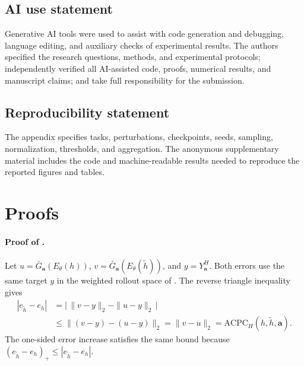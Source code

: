 \documentclass{article}
\begin{document}
\clearpage
\subsection*{AI use statement}
Generative AI tools were used to assist with code generation and debugging,
language editing, and auxiliary checks of experimental results. The authors
specified the research questions, methods, and experimental protocols;
independently verified all AI-assisted code, proofs, numerical results, and
manuscript claims; and take full responsibility for the submission.

\subsection*{Reproducibility statement}
The appendix specifies tasks, perturbations, checkpoints, seeds, sampling,
normalization, thresholds, and aggregation. The anonymous supplementary
material includes the code and machine-readable results needed to reproduce
the reported figures and tables.




\FloatBarrier
\appendix
\section{Proofs}\label{sec:appendix-acpc-proofs}

\paragraph{Proof of .}
Let $u=\bar G_{\mathbf a}(E_\theta(h))$,
$v=\bar G_{\mathbf a}(E_\theta(\tilde h))$, and $y=Y_{\mathbf a}^H$. Both
errors use the same target $y$ in the weighted rollout space of
. The reverse triangle inequality gives
\begin{align}
|e_{\tilde h}-e_h|
&=\bigl|\,\|v-y\|_2-\|u-y\|_2\,\bigr| \\
&\le \|(v-y)-(u-y)\|_2
=\|v-u\|_2
=\mathrm{ACPC}_H(h,\tilde h,\mathbf a).
\end{align}
The one-sided error increase satisfies the same bound because
$(e_{\tilde h}-e_h)_+\le|e_{\tilde h}-e_h|$.
\end{document}
